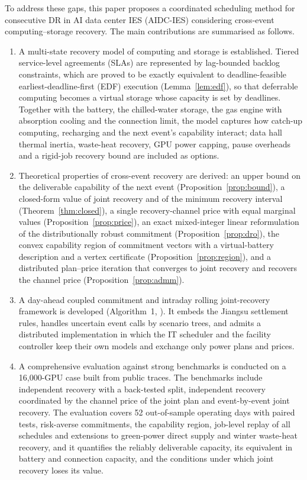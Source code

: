 To address these gaps, this paper proposes a coordinated scheduling method for consecutive DR in AI data center IES
(AIDC-IES) considering cross-event computing--storage recovery. The main contributions are summarised as follows.
\begin{enumerate}[label=(\arabic*),leftmargin=1.9em,itemsep=1.5pt]
\item A multi-state recovery model of computing and storage is established. Tiered service-level agreements (SLAs) are
represented by lag-bounded backlog constraints, which are proved to be exactly equivalent to deadline-feasible
earliest-deadline-first (EDF) execution (Lemma~\ref{lem:edf}), so that deferrable computing becomes a virtual storage
whose capacity is set by deadlines. Together with the battery, the chilled-water storage, the gas engine with
absorption cooling and the connection limit, the model captures how catch-up computing, recharging and the next
event's capability interact; data hall thermal inertia, waste-heat recovery, GPU power capping, pause overheads and a
rigid-job recovery bound are included as options.
\item Theoretical properties of cross-event recovery are derived: an upper bound on the deliverable capability of the
next event (Proposition~\ref{prop:bound}), a closed-form value of joint recovery and of the minimum recovery interval
(Theorem~\ref{thm:closed}), a single recovery-channel price with equal marginal values
(Proposition~\ref{prop:price}), an exact mixed-integer linear reformulation of the distributionally robust commitment
(Proposition~\ref{prop:dro}), the convex capability region of commitment vectors with a virtual-battery description
and a vertex certificate (Proposition~\ref{prop:region}), and a distributed plan--price iteration that converges to
joint recovery and recovers the channel price (Proposition~\ref{prop:admm}).
\item A day-ahead coupled commitment and intraday rolling joint-recovery framework is developed
(Algorithm~1, ). It embeds the Jiangsu settlement rules, handles uncertain event calls by
scenario trees, and admits a distributed implementation in which the IT scheduler and the facility controller keep their
own models and exchange only power plans and prices.
\item A comprehensive evaluation against strong benchmarks is conducted on a 16,000-GPU case built from public
traces. The benchmarks include independent recovery with a back-tested split, independent recovery coordinated by the
channel price of the joint plan and event-by-event joint recovery. The evaluation covers 52 out-of-sample operating
days with paired tests, risk-averse commitments, the capability region, job-level replay of all schedules and
extensions to green-power direct supply and winter waste-heat recovery, and it quantifies the reliably deliverable
capacity, its equivalent in battery and connection capacity, and the conditions under which joint recovery loses its
value.
\end{enumerate}
